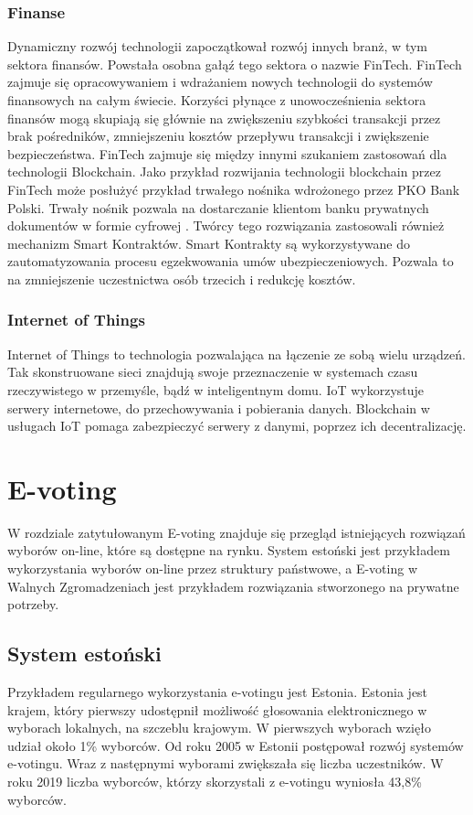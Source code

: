 \documentclass[a4paper,12pt]{book}
\begin{document}
\subsection{Finanse}

Dynamiczny rozwój technologii zapoczątkował rozwój innych branż, w tym sektora finansów. Powstała osobna gałąź tego sektora o nazwie FinTech. FinTech zajmuje się opracowywaniem i wdrażaniem nowych technologii do systemów finansowych na całym świecie. Korzyści płynące z unowocześnienia sektora finansów mogą skupiają się głównie na zwiększeniu szybkości transakcji przez brak pośredników, zmniejszeniu kosztów przepływu transakcji i zwiększenie bezpieczeństwa. FinTech zajmuje się między innymi szukaniem zastosowań dla technologii Blockchain. Jako przykład rozwijania technologii blockchain przez FinTech może posłużyć przykład trwałego nośnika wdrożonego przez PKO Bank Polski. Trwały nośnik pozwala na dostarczanie klientom banku prywatnych dokumentów w formie cyfrowej \cite{PKO}. Twórcy tego rozwiązania zastosowali również mechanizm Smart Kontraktów. Smart Kontrakty są wykorzystywane do zautomatyzowania procesu egzekwowania umów ubezpieczeniowych\cite{PKO-SMART}. Pozwala to na zmniejszenie uczestnictwa osób trzecich i redukcję kosztów.

\subsection{Internet of Things}

Internet of Things to technologia pozwalająca na łączenie ze sobą wielu urządzeń. Tak skonstruowane sieci znajdują swoje przeznaczenie w systemach czasu rzeczywistego w przemyśle, bądź w inteligentnym domu. IoT wykorzystuje serwery internetowe, do przechowywania i pobierania danych. Blockchain w usługach IoT pomaga zabezpieczyć serwery z danymi, poprzez ich decentralizację.

\newpage

\chapter{E-voting}
W rozdziale zatytułowanym E-voting znajduje się przegląd istniejących rozwiązań wyborów on-line, które są dostępne na rynku. System estoński jest przykładem wykorzystania wyborów on-line przez struktury państwowe, a E-voting w Walnych Zgromadzeniach jest przykładem rozwiązania stworzonego na prywatne potrzeby.

\section{System estoński}
Przykładem regularnego wykorzystania e-votingu jest Estonia. Estonia jest krajem, który pierwszy udostępnił możliwość głosowania elektronicznego w wyborach lokalnych, na szczeblu krajowym. W pierwszych wyborach wzięło udział około 1\% wyborców. Od roku 2005 w Estonii postępował rozwój systemów e-votingu. Wraz z następnymi wyborami zwiększała się liczba uczestników. W roku 2019 liczba wyborców, którzy skorzystali z e-votingu wyniosła 43,8\% wyborców.
\end{document}
